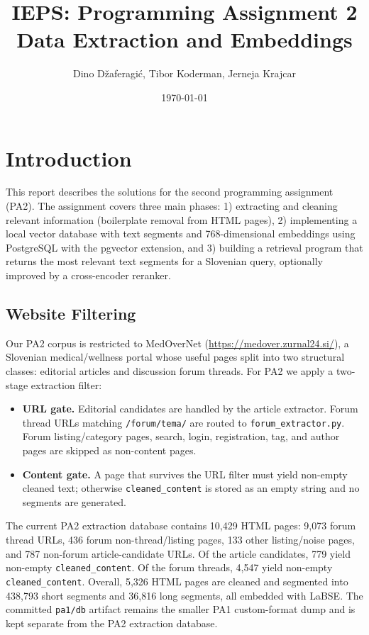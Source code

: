 \documentclass[9pt]{IEEEtran}
\title{\vspace{0ex}
IEPS: Programming Assignment 2\\Data Extraction and Embeddings}
\author{Dino Džaferagić, Tibor Koderman, Jerneja Krajcar}\vspace{-4.0ex}
\date{\today}
\begin{document}
\maketitle

\section{Introduction}
This report describes the solutions for the second programming assignment (PA2).
The assignment covers three main phases: 1) extracting and cleaning relevant information (boilerplate removal from HTML pages),
2) implementing a local vector database with text segments and 768-dimensional embeddings using PostgreSQL with the pgvector extension,
and 3) building a retrieval program that returns the most relevant text segments for a Slovenian query, optionally improved by a cross-encoder reranker.

\subsection{Website Filtering}
Our PA2 corpus is restricted to MedOverNet (\url{https://medover.zurnal24.si/}), a Slovenian medical/wellness portal whose useful pages split into two structural classes: editorial articles and discussion forum threads.
For PA2 we apply a two-stage extraction filter:
\begin{itemize}
    \item \textbf{URL gate.} Editorial candidates are handled by the article extractor. Forum thread URLs matching \texttt{/forum/tema/} are routed to \texttt{forum\_extractor.py}.
    Forum listing/category pages, search, login, registration, tag, and author pages are skipped as non-content pages.
    \item \textbf{Content gate.} A page that survives the URL filter must yield non-empty cleaned text; otherwise \texttt{cleaned\_content} is stored as an empty string and no segments are generated.
\end{itemize}
The current PA2 extraction database contains 10,429 HTML pages: 9,073 forum thread URLs, 436 forum non-thread/listing pages, 133 other listing/noise pages, and 787 non-forum article-candidate URLs.
Of the article candidates, 779 yield non-empty \texttt{cleaned\_content}. Of the forum threads, 4,547 yield non-empty \texttt{cleaned\_content}.
Overall, 5,326 HTML pages are cleaned and segmented into 438,793 short segments and 36,816 long segments, all embedded with LaBSE.
The committed \texttt{pa1/db} artifact remains the smaller PA1 custom-format dump and is kept separate from the PA2 extraction database.
\end{document}

